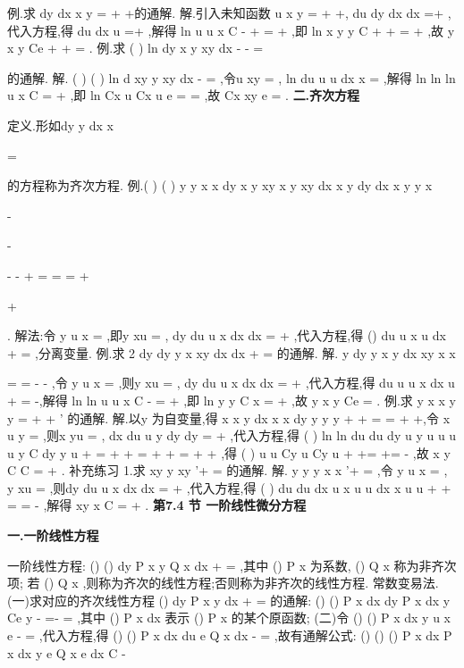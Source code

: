 \textcolor{lyred}{例}.求
dy
dx
x
y
=
+
+的通解. 
解.引入未知函数
u
x
y
=
+
+,
du
dy
dx
dx
=+
,代入方程,得
du
dx
u
=+
,解得 
ln
u
u
x
C
-
+
=
+
,即
ln
x
y
y
C
+
+
=
+
,故
y
x
y
Ce
+
+
=
. 
\textcolor{lyred}{例}.求
(
)
ln
dy
x
y
xy
dx -
-
=




的通解. 
解.
(
)
(
)
ln
d xy
y
xy
dx
-
=
,令u
xy
=
,
ln
du
u
u
dx
x
=
,解得
ln ln
ln
u
x
C
=
+
,即 
ln
Cx
u
Cx
u
e
=
\Rightarrow 
=
,故
Cx
xy
e
=
. 
\vspace{4pt}
{\bfseries \textcolor{lyred}{二.齐次方程}}

\textcolor{lyred}{定义}.形如dy
y
dx
x
\varphi 

=




的方程称为\textcolor{lyred}{齐次方程}. 
\textcolor{lyred}{例}.(
)
(
)
y
y
x
x
dy
x y
xy
x y
xy
dx
x
y
dy
dx
x
y
y
x


-

-


-
-
+
=
\Leftrightarrow 
=
=
+


+



. 
\textcolor{lyred}{解法}:令
y
u
x
=
,即y
xu
=
, dy
du
u
x
dx
dx
=
+
,代入方程,得
()
du
u
x
u
dx
\varphi 
+
=
,分离变量. 
\textcolor{lyred}{例}.求
2 dy
dy
y
x
xy
dx
dx
+
=
的通解. 
解.
y
dy
y
x
y
dx
xy
x
x






=
=
-
-
,令
y
u
x
=
,则y
xu
=
, dy
du
u
x
dx
dx
=
+
,代入方程,得 
du
u
u
x dx
u
+
=
-,解得
ln
ln
u
u
x
C
-
=
+
,即
ln
y
y
C
x
=
+
,故
y
x
y
Ce
=
. 
\textcolor{lyred}{例}.求
y
x
x
y
y =
+
+
'
的通解. 
解.以y 为自变量,得 
x
x
y
dx
x
x
dy
y
y
y
+
+
=
=
+
+,令
x
u
y
=
,则x
yu
=
, dx
du
u
y
dy
dy
=
+
,代入方程,得 
(
)
ln
ln
du
du
dy
u
y
u
u
u
u
y
C
dy
y
u
+
=
+
+\Rightarrow 
=
\Rightarrow 
+
+
=
+
+
\int 
\int 
,得 
(
)
u
u
Cy
u
Cy
u
+
+=
\Rightarrow 
+=
-
,故
x
y
C
C
=
+
. 
\textcolor{lyred}{补充练习 }
1.求
xy
y
xy
'+
=
的通解. 
解.
y
y
y
x
x
'+
=
,令
y
u
x
=
, y
xu
=
,则dy
du
u
x
dx
dx
=
+
,代入方程,得 
(
)
du
du
dx
u
x
u
u
dx
x
u
u
+
+
=
\Rightarrow 
=
-
,解得
xy
x
C
=
+
. 
\vspace{6pt}
{\large \bfseries \textcolor{lyred}{第7.4 节 一阶线性微分方程}}

\vspace{4pt}
{\bfseries \textcolor{lyred}{一.一阶线性方程}}

\textcolor{lyred}{一阶线性方程}:
()
()
dy
P x y
Q x
dx +
=
,其中
()
P x 为系数,
()
Q x 称为非齐次项; 
若
()
Q x \equiv 
,则称为\textcolor{lyred}{齐次的线性方程};否则称为\textcolor{lyred}{非齐次的线性方程}. 
\textcolor{lyred}{常数变易法}.(一)求对应的齐次线性方程
()
dy
P x y
dx +
=
的通解: 
()
()
P x dx
dy
P x dx
y
Ce
y
-\int 
=-
\Rightarrow 
=
,其中
()
P x dx
\int 
表示
()
P x 的某个原函数; 
(二)令
()
()
P x dx
y
u x e
-\int 
=
,代入方程,得 
()
()
P x dx
du e
Q x
dx
-\int 
=
,故有\textcolor{lyred}{通解公式}:
()
()
()
P x dx
P x dx
y
e
Q x e
dx
C
-


